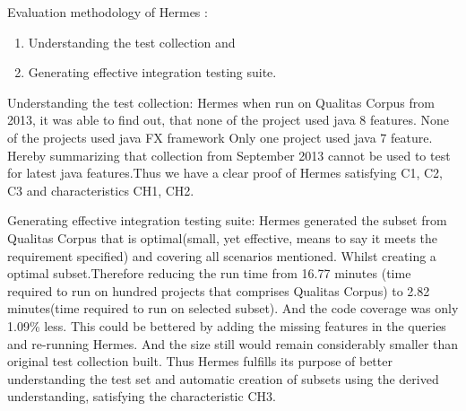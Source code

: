 \documentclass[authoryear,preprint]{sigplanconf}
\begin{document}
\begin{table*}[htbp]
	\centering
	\captionsetup{justification=centering}
	\caption{Characteristics available within each approach}
\label{tbl1}
\end{table*}

Evaluation methodology of Hermes : 
\begin{enumerate}
	\item Understanding the test collection and 
	\item Generating effective integration testing suite.
\end{enumerate}

Understanding the test collection:
Hermes when run on Qualitas Corpus from 2013, it was able to find out, that none of the project used java 8 features. None of the projects used java FX framework Only one project used java 7 feature. Hereby summarizing that collection from September 2013 cannot be used to test for latest java features.Thus we have a clear proof of Hermes satisfying C1, C2, C3 and characteristics CH1, CH2.

Generating effective integration testing suite:
Hermes generated the subset from Qualitas Corpus that is optimal(small, yet effective, means to say it meets the requirement specified) and covering all scenarios mentioned. Whilst creating a optimal subset.Therefore reducing the run time from 16.77 minutes (time required to run on hundred projects that comprises Qualitas Corpus) to 2.82 minutes(time required to run on selected subset). And the code coverage was only 1.09\% less. This could be bettered by adding the missing features in the queries and re-running Hermes. And the size still would remain considerably smaller than original test collection built. Thus Hermes fulfills its purpose of better understanding the test set and automatic creation of subsets using the derived understanding, satisfying the characteristic CH3.
\end{document}
